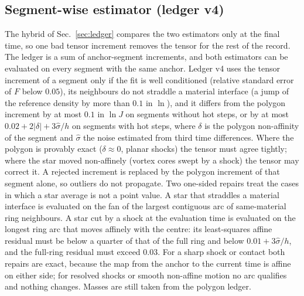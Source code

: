 \documentclass[11pt]{article}
\theoremstyle{definition}\newtheorem{definition}{Definition}\theoremstyle{remark}\newtheorem{remark}{Remark}
\begin{document}
\subsection{Segment-wise estimator (ledger v4)}\label{sec:v4}
The hybrid of Sec.~\ref{sec:ledger} compares the two estimators only at the final time, so one bad tensor increment removes the tensor for the rest of the record. The ledger is a sum of anchor-segment increments, and both estimators can be evaluated on every segment with the same anchor. Ledger v4 uses the tensor increment of a segment only if the fit is well conditioned (relative standard error of $F$ below $0.05$), its neighbours do not straddle a material interface (a jump of the reference density by more than $0.1$ in $\ln$), and it differs from the polygon increment by at most $0.1$ in $\ln J$ on segments without hot steps, or by at most $0.02+2|\delta|+3\hat\sigma/h$ on segments with hot steps, where $\delta$ is the polygon non-affinity of the segment and $\hat\sigma$ the noise estimated from third time differences. Where the polygon is provably exact ($\delta\approx0$, planar shocks) the tensor must agree tightly; where the star moved non-affinely (vortex cores swept by a shock) the tensor may correct it. A rejected increment is replaced by the polygon increment of that segment alone, so outliers do not propagate. Two one-sided repairs treat the cases in which a star average is not a point value. A star that straddles a material interface is evaluated on the fan of the largest contiguous arc of same-material ring neighbours. A star cut by a shock at the evaluation time is evaluated on the longest ring arc that moves affinely with the centre: its least-squares affine residual must be below a quarter of that of the full ring and below $0.01+3\hat\sigma/h$, and the full-ring residual must exceed $0.03$. For a sharp shock or contact both repairs are exact, because the map from the anchor to the current time is affine on either side; for resolved shocks or smooth non-affine motion no arc qualifies and nothing changes. Masses are still taken from the polygon ledger.
\end{document}
